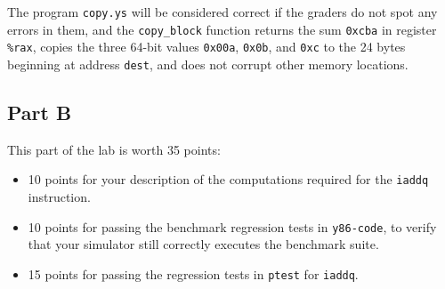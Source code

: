 \documentclass[11pt]{article}
\begin{document}
The program \texttt{copy.ys} will be considered correct if 
the graders do not spot any errors in them, 
and the
\texttt{copy\_block} 
function returns the sum \texttt{0xcba} in register \texttt{\%rax},
copies the three 64-bit values \texttt{0x00a}, \texttt{0x0b}, and
\texttt{0xc} to the 24 bytes
beginning at 
address {\tt dest}, and does not corrupt other memory locations.

\subsection*{Part B}

This part of the lab is worth 35 points: 
\begin{itemize}
\item 10 points for your description of the computations required 
for the {\tt iaddq} instruction.
\item 10 points for passing the benchmark regression tests in
\texttt{y86-code}, to verify that your simulator still correctly
executes the benchmark suite.
\item 15 points for passing the regression tests in {\tt ptest} 
for {\tt iaddq}.
\end{itemize}
\end{document}
